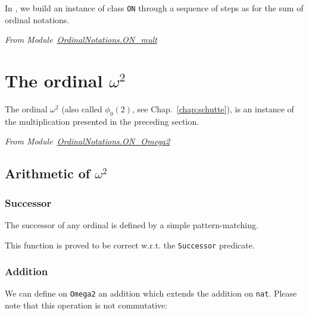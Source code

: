 In \coq{}, we build an instance of class \texttt{ON} through a sequence of steps as for the sum of ordinal notations.

\vspace{4pt}
\noindent
\emph{From Module~\href{../theories/html/hydras.OrdinalNotations.ON_mult.html}{OrdinalNotations.ON\_mult}}


\section{The ordinal \texorpdfstring{$\omega^2$}{omega2}}

The ordinal $\omega^2$ (also called $\phi_0(2)$, see Chap.~\ref{chap:schutte}), is an instance of the multiplication presented in the preceding section.

\vspace{4pt}
\noindent\emph{From Module~\href{../theories/html/hydras.OrdinalNotations.ON_Omega2.html}{OrdinalNotations.ON\_Omega2}}


\subsection{Arithmetic of \texorpdfstring{$\omega^2$}{omega^2}} 

\subsubsection{Successor}

The successor of any ordinal is defined by a simple pattern-matching.




This function is proved to be correct w.r.t. the \texttt{Successor} predicate.






\subsubsection{Addition}

We can define on \texttt{Omega2} an addition which extends the addition on \texttt{nat}. Please note that this operation is not commutative:

